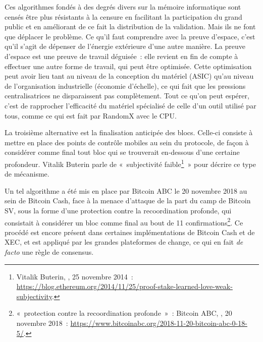 Ces algorithmes fondés à des degrés divers sur la mémoire informatique sont censés être plus résistants à la censure en facilitant la participation du grand public et en améliorant de ce fait la distribution de la validation. Mais ils ne font que déplacer le problème. Ce qu'il faut comprendre avec la preuve d'espace, c'est qu'il s'agit de dépenser de l'énergie extérieure d'une autre manière. La preuve d'espace est une preuve de travail déguisée~: elle revient en fin de compte à effectuer une autre forme de travail, qui peut être optimisée. Cette optimisation peut avoir lieu tant au niveau de la conception du matériel (ASIC) qu'au niveau de l'organisation industrielle (économie d'échelle), ce qui fait que les pressions centralisatrices ne disparaissent pas complètement. Tout ce qu'on peut espérer, c'est de rapprocher l'efficacité du matériel spécialisé de celle d'un outil utilisé par tous, comme ce qui est fait par RandomX avec le CPU.


La troisième alternative est la finalisation anticipée des blocs. Celle-ci consiste à mettre en place des points de contrôle mobiles au sein du protocole, de façon à considérer comme final tout bloc qui se trouverait en-dessous d'une certaine profondeur. Vitalik Buterin parle de «~subjectivité faible\footnote{Vitalik Buterin, , 25 novembre 2014~: \url{https://blog.ethereum.org/2014/11/25/proof-stake-learned-love-weak-subjectivity}.}~» pour décrire ce type de mécanisme.

Un tel algorithme a été mis en place par Bitcoin ABC le 20 novembre 2018 au sein de Bitcoin Cash, face à la menace d'attaque de la part du camp de Bitcoin SV, sous la forme d'une protection contre la recoordination profonde, qui consistait à considérer un bloc comme final au bout de 11 confirmations\footnote{«~protection contre la recoordination profonde~»~: Bitcoin ABC, , 20 novembre 2018~: \url{https://www.bitcoinabc.org/2018-11-20-bitcoin-abc-0-18-5/}.}. Ce procédé est encore présent dans certaines implémentations de Bitcoin Cash et de XEC, et est appliqué par les grandes plateformes de change, ce qui en fait \emph{de facto} une règle de consensus. %

